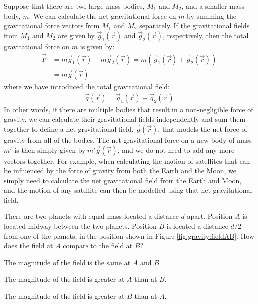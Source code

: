 Suppose that there are two large mass bodies, $M_1$ and $M_2$, and a smaller mass body, $m$. We can calculate the net gravitational force on $m$ by summing the gravitational force vectors from $M_1$ and $M_2$ separately. If the gravitational fields from $M_1$ and $M_2$ are given by $\vec g_1(\vec r)$ and $\vec g_2(\vec r)$, respectively, then the total gravitational force on $m$ is given by:
\begin{align*}
\vec F &= m\vec g_1(\vec r) + m\vec g_2(\vec r)=m(\vec g_1(\vec r)+\vec g_2(\vec r))\\
&=m \vec g(\vec r)
\end{align*}
where we have introduced the total gravitational field:
\begin{align*}
\vec g(\vec r) = \vec g_1(\vec r)+\vec g_2(\vec r)
\end{align*}
In other words, if there are multiple bodies that result in a non-negligible force of gravity, we can calculate their gravitational fields independently and sum them together to define a net gravitational field, $\vec g(\vec r)$, that models the net force of gravity from all of the bodies. The net gravitational force on a new body of mass $m'$ is then simply given by $m'\vec g(\vec r)$, and we do not need to add any more vectors together. For example, when calculating the motion of satellites that can be influenced by the force of gravity from both the Earth and the Moon, we simply need to calculate the net gravitational field from the Earth and Moon, and the motion of any satellite can then be modelled using that net gravitational field.
\newpage
\begin{checkpoint}
\begin{MCquestion}{There are two planets with equal mass located a distance $d$ apart. Position $A$ is located midway between the two planets. Position $B$ is located a distance $d/2$ from one of the planets, in the position shown in Figure \ref{fig:gravity:fieldAB}. How does the field at $A$ compare to the field at $B$?}
\item The magnitude of the field is the same at $A$ and $B$.
\item The magnitude of the field is greater at $A$ than at $B$.
\item The magnitude of the field is greater at $B$ than at $A$. \correct
\end{MCquestion}
\end{checkpoint}

